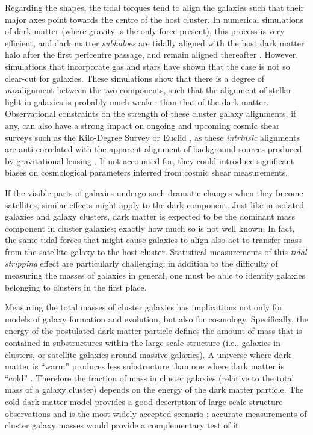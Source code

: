 Regarding the shapes, the tidal torques tend to align the galaxies such that their major axes point towards the centre of the host cluster. In numerical simulations of dark matter (where gravity is the only force present), this process is very efficient, and dark matter \emph{subhaloes} are tidally aligned with the host dark matter halo after the first pericentre passage, and remain aligned thereafter \citep[e.g.,][]{kuhlen07,pereira10}. However, simulations that incorporate gas and stars have shown that the case is not so clear-cut for galaxies. These simulations show that there is a degree of \emph{mis}alignment between the two components, such that the alignment of stellar light in galaxies is probably much weaker than that of the dark matter. Observational constraints on the strength of these cluster galaxy alignments, if any, can also have a strong impact on ongoing and upcoming cosmic shear surveys such as the Kilo-Degree Survey \citep[KiDS,][]{dejong15} or Euclid \citep{laureijs11}, as these \emph{intrinsic} alignments are anti-correlated with the apparent alignment of background sources produced by gravitational lensing \citep{hirata04}. If not accounted for, they could introduce significant biases on cosmological parameters inferred from cosmic shear measurements.

If the visible parts of galaxies undergo such dramatic changes when they become satellites, similar effects might apply to the dark component. Just like in isolated galaxies and galaxy clusters, dark matter is expected to be the dominant mass component in cluster galaxies; exactly how much so is not well known. In fact, the same tidal forces that might cause galaxies to align also act to transfer mass from the satellite galaxy to the host cluster. Statistical measurements of this \emph{tidal stripping} effect are particularly challenging: in addition to the difficulty of measuring the masses of galaxies in general, one must be able to identify galaxies belonging to clusters in the first place.

Measuring the total masses of cluster galaxies has implications not only for models of galaxy formation and evolution, but also for cosmology. Specifically, the energy of the postulated dark matter particle defines the amount of mass that is contained in substructures within the large scale structure (i.e., galaxies in clusters, or satellite galaxies around massive galaxies). A universe where dark matter is ``warm'' produces less substructure than one where dark matter is ``cold'' \citep[e.g.,][]{libeskind13}. Therefore the fraction of mass in cluster galaxies (relative to the total mass of a galaxy cluster) depends on the energy of the dark matter particle. %
The cold dark matter model provides a good description of large-scale structure observations and is the most widely-accepted scenario \citep[e.g.,][]{blumenthal84,frenk12}; accurate measurements of cluster galaxy masses would provide a complementary test of it.


